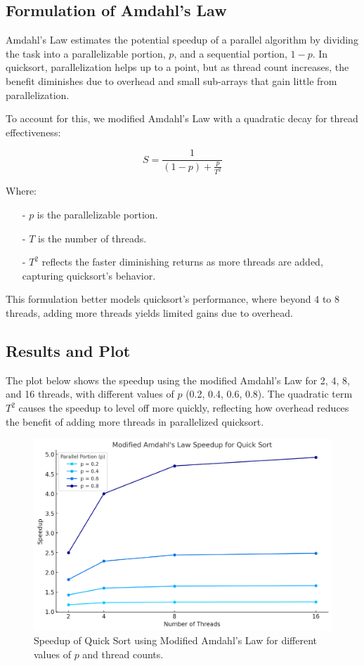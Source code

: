 \documentclass{article}
\begin{document}
\subsection{Formulation of Amdahl’s Law}
Amdahl's Law estimates the potential speedup of a parallel algorithm by dividing the task into a parallelizable portion, \(p\), and a sequential portion, \(1 - p\). In quicksort, parallelization helps up to a point, but as thread count increases, the benefit diminishes due to overhead and small sub-arrays that gain little from parallelization.

To account for this, we modified Amdahl’s Law with a quadratic decay for thread effectiveness:

\[
S = \frac{1}{(1 - p) + \frac{p}{T^2}}
\]

Where:
 \begin{enumerate}
     \item[-] \( p \) is the parallelizable portion.
     \item[-] \( T \) is the number of threads.
     \item[-] \( T^2 \) reflects the faster diminishing returns as more threads are added, capturing quicksort’s behavior.
 \end{enumerate}

This formulation better models quicksort's performance, where beyond 4 to 8 threads, adding more threads yields limited gains due to overhead.

\subsection{Results and Plot}
The plot below shows the speedup using the modified Amdahl’s Law for 2, 4, 8, and 16 threads, with different values of \(p\) (0.2, 0.4, 0.6, 0.8). The quadratic term \(T^2\) causes the speedup to level off more quickly, reflecting how overhead reduces the benefit of adding more threads in parallelized quicksort.

\begin{figure}[H]
    \centering
    \includegraphics[width=1.0\linewidth]{LaTex/images/Amdahls Law.png}
    \caption{Speedup of Quick Sort using Modified Amdahl’s Law for different values of \(p\) and thread counts.}
    \label{fig:amdahls-law-speedup}
\end{figure}
\end{document}
